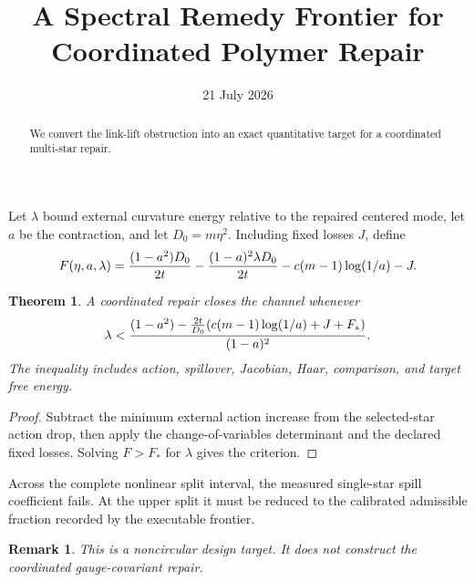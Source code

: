 \documentclass[11pt]{article}\usepackage[margin=1in]{geometry}\usepackage{amsmath,amsthm}\newtheorem{theorem}{Theorem}\newtheorem{remark}{Remark}
\title{A Spectral Remedy Frontier for Coordinated Polymer Repair}\author{}\date{21 July 2026}
\begin{document}
\maketitle
\begin{abstract}We convert the link-lift obstruction into an exact quantitative target for a coordinated multi-star repair.\end{abstract}
Let $\lambda$ bound external curvature energy relative to the repaired centered mode, let $a$ be the contraction, and let $D_0=m\eta^2$. Including fixed losses $J$, define
\[F(\eta,a,\lambda)={(1-a^2)D_0\over2t}-{(1-a)^2\lambda D_0\over2t}-c(m-1)\log(1/a)-J.\]
\begin{theorem}A coordinated repair closes the channel whenever
\[\lambda<{(1-a^2)-{2t\over D_0}(c(m-1)\log(1/a)+J+F_*)\over(1-a)^2}.
\]
The inequality includes action, spillover, Jacobian, Haar, comparison, and target free energy.\end{theorem}
\begin{proof}Subtract the minimum external action increase from the selected-star action drop, then apply the change-of-variables determinant and the declared fixed losses. Solving $F>F_*$ for $\lambda$ gives the criterion.\end{proof}
Across the complete nonlinear split interval, the measured single-star spill coefficient fails. At the upper split it must be reduced to the calibrated admissible fraction recorded by the executable frontier.
\begin{remark}This is a noncircular design target. It does not construct the coordinated gauge-covariant repair.\end{remark}
\end{document}

